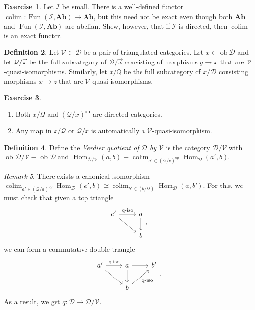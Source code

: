 \documentclass[10pt,letterpaper,cm]{nupset}
\theoremstyle{definition}
\newtheorem{definition}{Definition}[subsection]
\theoremstyle{theorem}
\newtheorem{exercise}[definition]{Exercise}
\theoremstyle{remark}
\newtheorem{remark}[definition]{Remark}
\newcommand{\Q}{\mathbb Q}
\newcommand{\1}{\mathbf{1}}
\renewcommand{\d}{\mathscr{D}}
\renewcommand{\i}{\mathscr{I}}
\newcommand{\q}{\mathscr{Q}}
\renewcommand{\v}{\mathscr{V}}
\newcommand{\x}{\vec x}
\newcommand{\0}{\vec 0}
\DeclareMathOperator{\op}{op}
\DeclareMathOperator{\ob}{ob}
\DeclareMathOperator{\Hom}{Hom}
\DeclareMathOperator{\Fun}{Fun}
\DeclareMathOperator{\colim}{colim}
\begin{document}
\begin{exercise}
Let $\i$ be small. There is a well-defined functor $\colim : \Fun(\i, \mathbf{Ab}) \to \mathbf{Ab}$, but this need not be exact even though both $\mathbf{Ab}$ and $\Fun(\i, \mathbf{Ab})$ are abelian. Show, however, that if $\i$ is directed, then $\colim$ is an exact functor. 
\end{exercise}

\begin{definition}
 Let $\v \subset \d$ be a pair of triangulated categories. Let $x \in \ob{\d}$ and let $\q/\x$ be the full subcategory of $\d/\x$ consisting of morphisms $y \to x$ that are $\v$-quasi-isomorphisms. Similarly, let $x/\Q$ be the full subcategory of $x/\d$ consisting morphisms $x \to z$ that are $\v$-quasi-isomorphisms. 
\end{definition}

\begin{exercise} $ $
\begin{enumerate}
\item Both $x/ \q$ and $(\q/x)^{\op}$ are directed categories. 
\item Any map in $x/\q$ or $\q/x$ is automatically a $\v$-quasi-isomorphism. 
\end{enumerate}
\end{exercise}

\begin{definition}
Define the \textit{Verdier quotient of $\d$ by $\v$} is the category $\d/\v$ with $\ob{\d/\v} \equiv \ob{\d}$ and $\Hom_{\d/\v}(a,b) \equiv \colim_{a' \in (\q/a)^{\op}} \Hom_{\d}(a',b)$.
\end{definition}

\begin{remark}
There exists a canonical isomorphism $\colim_{a' \in (\q/a)^{\op}} \Hom_{\d}(a', b) \cong \colim_{b' \in (b/\q)}\Hom_{\d}(a, b')$.  For this, we must check that given a top triangle 
\[
\begin{tikzcd}
a' \arrow[r, "\text{q-iso}"] \arrow[rd] & a \arrow[d] \\
                                        & b          
\end{tikzcd},
\] we can form a commutative double triangle  
\[
\begin{tikzcd}
a' \arrow[r, "\text{q-iso}"] \arrow[rd] & a \arrow[d] \arrow[r]         & b' \\
                                        & b \arrow[ru, "\text{q-iso}"'] &   
\end{tikzcd}
.\]
As a result, we get $q: \d \to \d/\v$.
\end{remark}
\end{document}
